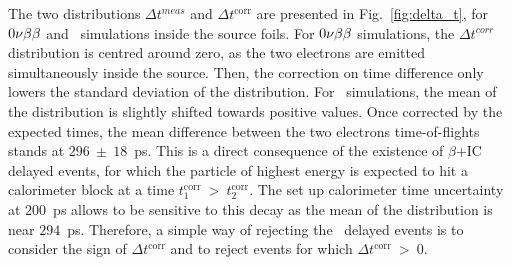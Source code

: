 The two distributions $\Delta t^{meas}$ and $\Delta t^{\text{corr}}$ are presented in Fig.~\ref{fig:delta_t}, for $0\nu\beta\beta$ and \Tl\ simulations inside the source foils.
For $0\nu\beta\beta$ simulations, the $\Delta t^{corr}$ distribution is centred around zero, as the two electrons are emitted simultaneously inside the source.
Then, the correction on time difference only lowers the standard deviation of the distribution.
For \Tl\ simulations, the mean of the distribution is slightly shifted towards positive values.
Once corrected by the expected times, the mean difference between the two electrons time-of-flights stands at $296~\pm~18$~ps.
This is a direct consequence of the existence of $\beta$+IC delayed events, for which the particle of highest energy is expected to hit a calorimeter block at a time $t^{\text{corr}}_{1}~>~t^{\text{corr}}_{2}$.
The set up calorimeter time uncertainty at $200$~ps allows to be sensitive to this decay as the mean of the distribution is near $294$~ps.
Therefore, a simple way of rejecting the \Tl\ delayed events is to consider the sign of $\Delta t^{\text{corr}}$ and to reject events for which $\Delta t^{\text{corr}}~>~0$.
